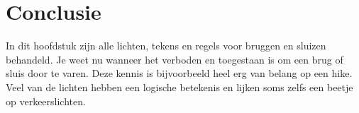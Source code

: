 \section{Conclusie}
In dit hoofdstuk zijn alle lichten, tekens en regels voor bruggen en sluizen behandeld. Je weet nu wanneer het verboden en toegestaan is om een brug of sluis door te varen. Deze kennis is bijvoorbeeld heel erg van belang op een hike. Veel van de lichten hebben een logische betekenis en lijken soms zelfs een beetje op verkeerslichten. 
